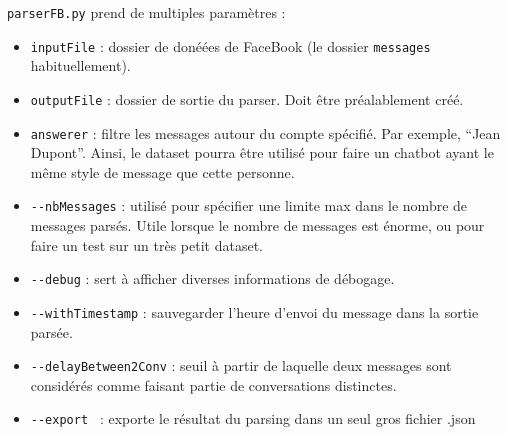 \documentclass[10pt,a4paper]{article}
\begin{document}
\texttt{parserFB.py} prend de multiples paramètres :
\begin{itemize}
 \item \texttt{inputFile} : dossier de donéées de FaceBook (le dossier \texttt{messages} habituellement).
 \item \texttt{outputFile} : dossier de sortie du parser. Doit être préalablement créé.
 \item \texttt{answerer} : filtre les messages autour du compte spécifié. Par exemple, ``Jean Dupont''. Ainsi, le dataset pourra être utilisé pour faire un chatbot ayant le même style de message que cette personne.
 \item \texttt{-{}-nbMessages} : utilisé pour spécifier une limite max dans le nombre de messages parsés. Utile lorsque le nombre de messages est énorme, ou pour faire un test sur un très petit dataset.
 \item \texttt{-{}-debug} : sert à afficher diverses informations de débogage.
 \item \texttt{-{}-withTimestamp} : sauvegarder l'heure d'envoi du message dans la sortie parsée.
 \item \texttt{-{}-delayBetween2Conv} : seuil à partir de laquelle deux messages sont considérés comme faisant partie de conversations distinctes.
 \item \texttt{-{}-export } : exporte le résultat du parsing dans un seul gros fichier .json
\end{itemize}
\end{document}
